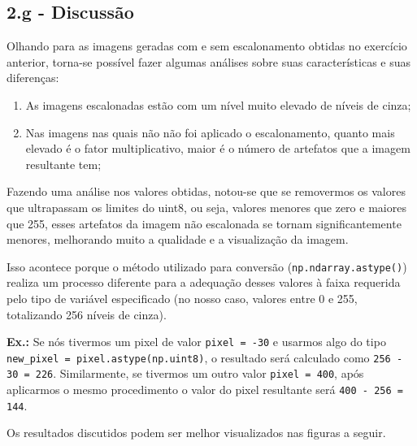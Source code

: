 \documentclass{article}
\begin{document}
\subsection*{2.g - Discussão}	

Olhando para as imagens geradas com e sem escalonamento obtidas no exercício anterior, torna-se possível fazer algumas análises sobre suas características e suas diferenças:

\begin{enumerate}
	\item As imagens escalonadas estão com um nível muito elevado de níveis de cinza;
	\item Nas imagens nas quais não não foi aplicado o escalonamento, quanto mais elevado é o fator multiplicativo, maior é o número de artefatos que a imagem resultante tem;
\end{enumerate}

Fazendo uma análise nos valores obtidas, notou-se que se removermos os valores que ultrapassam os limites do uint8, ou seja, valores menores que zero e maiores que 255, esses artefatos da imagem não escalonada se tornam significantemente menores, melhorando muito a qualidade e a visualização da imagem.

Isso acontece porque o método utilizado para conversão (\lstinline|np.ndarray.astype()|) realiza um processo diferente para a adequação desses valores à faixa requerida pelo tipo de variável especificado (no nosso caso, valores entre 0 e 255, totalizando 256 níveis de cinza).

\textbf{Ex.:} Se nós tivermos um pixel de valor \lstinline|pixel = -30| e usarmos algo do tipo \lstinline|new_pixel = pixel.astype(np.uint8)|, o resultado será calculado como \lstinline|256 - 30 = 226|. Similarmente, se tivermos um outro valor \lstinline|pixel = 400|, após aplicarmos o mesmo procedimento o valor do pixel resultante será \lstinline|400 - 256 = 144|.

Os resultados discutidos podem ser melhor visualizados nas figuras a seguir.
\end{document}
